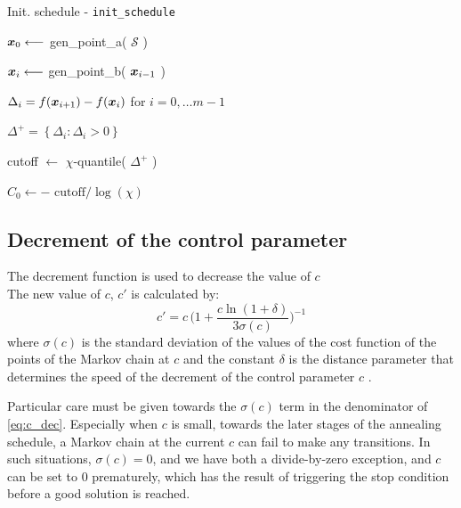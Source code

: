 \begin{algorithm}
\caption{Init. schedule - \texttt{init\_schedule}}\label{algo:init_sched}
\vspace{8pt}
\nosemic
\SetAlgoLined


$\boldsymbol{x}_0 \longleftarrow$ gen\_point\_a( $\mathcal{S}$ ) \;

 {
    $\boldsymbol{x}_i \longleftarrow $ gen\_point\_b( $\boldsymbol{x}_{i-1}$ ) \;
}

$\Delta_i = f(\boldsymbol{x}_{i+1}) - f(\boldsymbol{x}_i)$ for $i = 0,\ldots m-1$ \;

$\Delta^+ = \left\lbrace \Delta_i : \Delta_i > 0 \right\rbrace $ \;

cutoff $\longleftarrow$ $\chi$-quantile( $\Delta^+$ ) \;

$C_0 \longleftarrow -\text{ cutoff} / \log(\chi)$ \;

 \;


\end{algorithm}

\subsection{Decrement of the control parameter}
The decrement function is used to decrease the value of $c$\\
The new value of $c$, $c'$ is calculated by:
\begin{equation}\label{eq:c_dec}
    c'=c \, \Bigg(1+\dfrac{c\ln(1+\delta)}{3\sigma (c)}\Bigg)^{-1} 
\end{equation} 
where $\sigma(c)$ is the standard deviation of the values of the cost function of the points of the Markov chain at $c$ and the constant $\delta$ is the distance parameter that determines the speed of the decrement of the control parameter $c$ \cite{dekkers}.

Particular care must be given towards the $\sigma(c)$ term in the denominator of \cref{eq:c_dec}. Especially when $c$ is small, towards
the later stages of the annealing schedule, a Markov chain at the current $c$ can fail to make any transitions. In such situations,
$\sigma(c) = 0$, and we have both a divide-by-zero exception, and $c$ can be set to 0 prematurely, which has the result of triggering
the stop condition before a good solution is reached.

